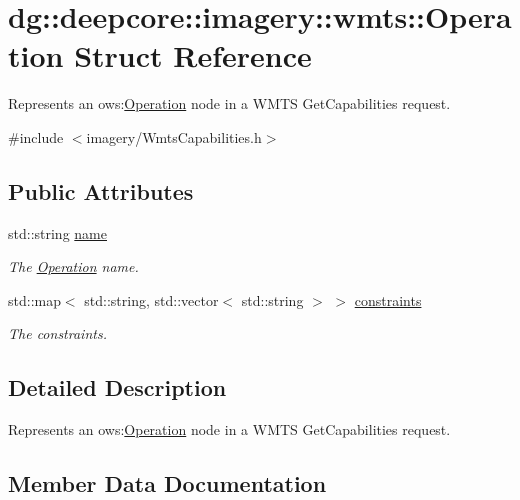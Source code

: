 \hypertarget{structdg_1_1deepcore_1_1imagery_1_1wmts_1_1_operation}{}\section{dg\+:\+:deepcore\+:\+:imagery\+:\+:wmts\+:\+:Operation Struct Reference}
\label{structdg_1_1deepcore_1_1imagery_1_1wmts_1_1_operation}


Represents an ows\+:\hyperlink{structdg_1_1deepcore_1_1imagery_1_1wmts_1_1_operation}{Operation} node in a W\+M\+TS Get\+Capabilities request.  




{\ttfamily \#include $<$imagery/\+Wmts\+Capabilities.\+h$>$}

\subsection*{Public Attributes}
\begin{DoxyCompactItemize}
\item 
std\+::string \hyperlink{structdg_1_1deepcore_1_1imagery_1_1wmts_1_1_operation_a8263a9299fabb3467f2a38baeba1b9b0}{name}
\begin{DoxyCompactList}\small\item\em The \hyperlink{structdg_1_1deepcore_1_1imagery_1_1wmts_1_1_operation}{Operation} name. \end{DoxyCompactList}\item 
std\+::map$<$ std\+::string, std\+::vector$<$ std\+::string $>$ $>$ \hyperlink{structdg_1_1deepcore_1_1imagery_1_1wmts_1_1_operation_ab607d8f694296244e6a16f98ff4098f5}{constraints}
\begin{DoxyCompactList}\small\item\em The constraints. \end{DoxyCompactList}\end{DoxyCompactItemize}


\subsection{Detailed Description}
Represents an ows\+:\hyperlink{structdg_1_1deepcore_1_1imagery_1_1wmts_1_1_operation}{Operation} node in a W\+M\+TS Get\+Capabilities request. 

\subsection{Member Data Documentation}
